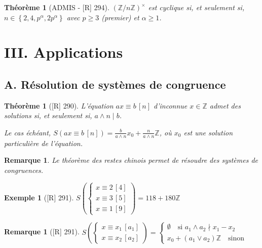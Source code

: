 \documentclass[10pt, a4paper, parskip=full, twoside, twocolumn]{report}
\newtheorem{theorem}[definition]{Théorème}
\newtheorem{example}[definition]{Exemple}
\newtheorem{remark}[definition]{Remarque}
\newcommand{\IZ}{\mathbb{Z}}
\newcommand{\IZnZ}{\mathbb{Z}/n\mathbb{Z}}
\begin{document}
\begin{theorem}[ADMIS - \textnormal{[R] 294}]
	$\left(\IZnZ\right)^{\times}$ est cyclique si, et seulement si, $n\in \left\{2,4,p^{\alpha}, 2p^{\alpha}\right\}$ avec $p\geq 3$ (premier) et $\alpha\geq 1$.
\end{theorem}

\section*{III. Applications}
\subsection*{A. Résolution de systèmes de congruence}
\begin{theorem}[\textnormal{[R] 290}]
	L'équation $ax\equiv b\,[n]$ d'inconnue $x\in\IZ$ admet des solutions si, et seulement si, $a\wedge n \mid b$.

	Le cas échéant, $S(ax\equiv b\,[n]) = \frac{b}{a\wedge n}x_0 + \frac{n}{a\wedge n}\IZ$, où $x_0$ est une solution particulière de l'équation.
\end{theorem}

\begin{remark}
	Le théorème des restes chinois permet de résoudre des systèmes de congruences.
\end{remark}


\begin{tcolorbox}[
    breakable, %
    colback=developpement, %
    colframe=gray!0!black, %
    boxrule=0pt, %
    arc=1mm, %
	boxsep=0pt,
	left=0pt, right=0pt, top=0pt, bottom=0pt
]
\begin{example}[\textnormal{[R] 291}]
	\label{120dev12}
	$S\left(\begin{cases}
		x\equiv 2\,[4] \\
		x\equiv 3\,[5] \\
		x\equiv 1\,[9]
	\end{cases}\right) = 118 + 180\IZ$
\end{example}
\end{tcolorbox}

\begin{remark}[\textnormal{[R] 291}]
	$S\left(\begin{cases}
		x\equiv x_1\,[a_1] \\
		x\equiv x_2\,[a_2]
	\end{cases}\right) =\begin{cases}
		\emptyset\quad\text{si } a_1\wedge a_2 \nmid x_1-x_2 \\
		x_0 + (a_1\vee a_2)\IZ\quad\text{sinon}
	\end{cases}$
\end{remark}
\end{document}
